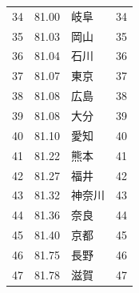 \begin{table}[ht]
\begin{tabular}{rrlr}
  34 & 81.00 & 岐阜 &  34 \\
  35 & 81.03 & 岡山 &  35 \\
  36 & 81.04 & 石川 &  36 \\
  37 & 81.07 & 東京 &  37 \\
  38 & 81.08 & 広島 &  38 \\
  39 & 81.08 & 大分 &  39 \\
  40 & 81.10 & 愛知 &  40 \\
  41 & 81.22 & 熊本 &  41 \\
  42 & 81.27 & 福井 &  42 \\
  43 & 81.32 & 神奈川 &  43 \\
  44 & 81.36 & 奈良 &  44 \\
  45 & 81.40 & 京都 &  45 \\
  46 & 81.75 & 長野 &  46 \\
  47 & 81.78 & 滋賀 &  47 \\
   \hline
\end{tabular}
\end{table}








